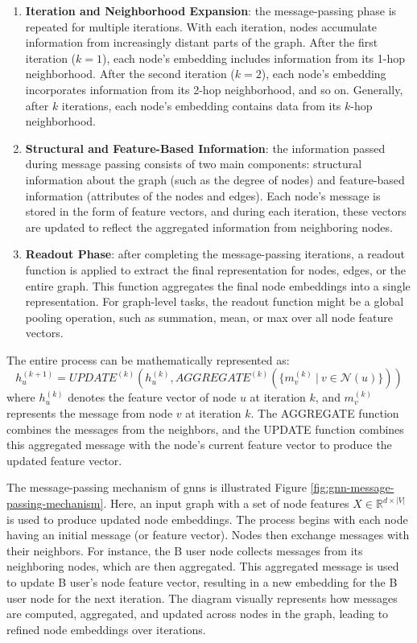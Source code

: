 \begin{enumerate}
    \item \textbf{Iteration and Neighborhood Expansion}: the message-passing phase is repeated for multiple iterations. With each iteration, nodes accumulate information from increasingly distant parts of the graph. After the first iteration (\(k=1\)), each node's embedding includes information from its 1-hop neighborhood. After the second iteration (\(k=2\)), each node's embedding incorporates information from its 2-hop neighborhood, and so on. Generally, after \(k\) iterations, each node's embedding contains data from its \(k\)-hop neighborhood.

    \item \textbf{Structural and Feature-Based Information}: the information passed during message passing consists of two main components: structural information about the graph (such as the degree of nodes) and feature-based information (attributes of the nodes and edges). Each node's message is stored in the form of feature vectors, and during each iteration, these vectors are updated to reflect the aggregated information from neighboring nodes.

    \item \textbf{Readout Phase}: after completing the message-passing iterations, a readout function is applied to extract the final representation for nodes, edges, or the entire graph. This function aggregates the final node embeddings into a single representation. For graph-level tasks, the readout function might be a global pooling operation, such as summation, mean, or max over all node feature vectors.
\end{enumerate}

The entire process can be mathematically represented as:
   \[
   h_u^{(k+1)} = UPDATE^{(k)}\left(h_u^{(k)}, AGGREGATE^{(k)}\left(\{m_{v}^{(k)}~|~v \in \mathcal{N}(u)\}\right)\right)
   \]
where \(h_u^{(k)}\) denotes the feature vector of node \(u\) at iteration \(k\), and \(m_{v}^{(k)}\) represents the message from node \(v\) at iteration \(k\). The AGGREGATE function combines the messages from the neighbors, and the UPDATE function combines this aggregated message with the node's current feature vector to produce the updated feature vector.

The message-passing mechanism of \glspl{gnn} is illustrated Figure \ref{fig:gnn-message-passing-mechanism}.
Here, an input graph with a set of node features \(X \in \mathbb{R}^{d \times |V|}\) is used to produce updated node embeddings.
The process begins with each node having an initial message (or feature vector).
Nodes then exchange messages with their neighbors. For instance, the B user node collects messages from its neighboring nodes, which are then aggregated.
This aggregated message is used to update B user's node feature vector, resulting in a new embedding for the B user node for the next iteration.
The diagram visually represents how messages are computed, aggregated, and updated across nodes in the graph, leading to refined node embeddings over iterations.

